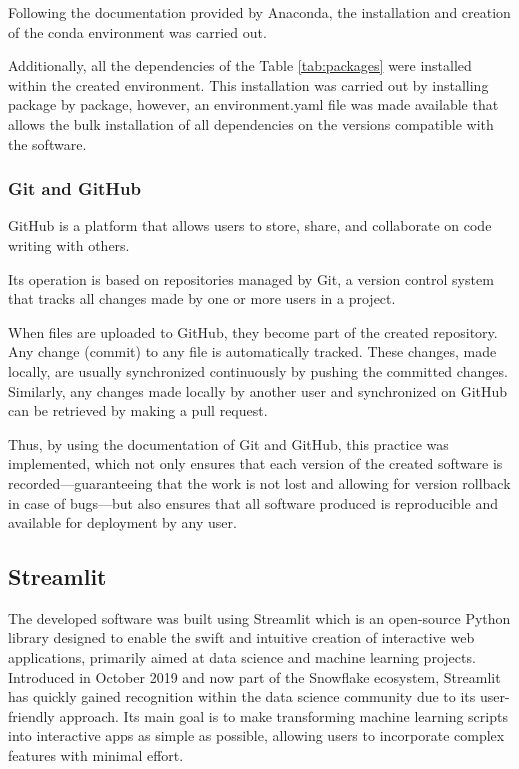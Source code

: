 Following the documentation provided by Anaconda, the installation and creation of the conda environment was carried out. \cite{anaconda3} 

Additionally, all the dependencies of the Table \ref{tab:packages} were installed within the created environment. This installation was carried out by installing package by package, however, an environment.yaml file was made available that allows the bulk installation \cite{anaconda4} of all dependencies on the versions compatible with the software.

\subsubsection{\textbf{Git and GitHub}}

GitHub is a platform that allows users to store, share, and collaborate on code writing with others. \cite{github}

Its operation is based on repositories managed by Git, a version control system that tracks all changes made by one or more users in a project. \cite{github}

When files are uploaded to GitHub, they become part of the created repository. Any change (commit) to any file is automatically tracked. These changes, made locally, are usually synchronized continuously by pushing the committed changes. Similarly, any changes made locally by another user and synchronized on GitHub can be retrieved by making a pull request. \cite{github}

Thus, by using the documentation of Git and GitHub, this practice was implemented, which not only ensures that each version of the created software is recorded—guaranteeing that the work is not lost and allowing for version rollback in case of bugs—but also ensures that all software produced is reproducible and available for deployment by any user. \cite{github}

\subsection{Streamlit}

The developed software was built using Streamlit which is an open-source Python library designed to enable the swift and intuitive creation of interactive web applications, primarily aimed at data science and machine learning projects. Introduced in October 2019 and now part of the Snowflake ecosystem, Streamlit has quickly gained recognition within the data science community due to its user-friendly approach. Its main goal is to make transforming machine learning scripts into interactive apps as simple as possible, allowing users to incorporate complex features with minimal effort. \cite{Sehm2022}

